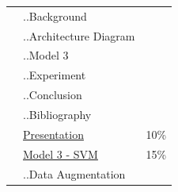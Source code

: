 \documentclass[paper=a4, fontsize=11pt]{scrartcl}
\numberwithin{equation}{section}		%
\numberwithin{table}{section}				%
\begin{document}
\begin{table}[h!]
\begin{center}
\begin{tabular}{l|l|c}
                     & ..Background&\\
                     & ..Architecture Diagram&\\
                     & ..Model 3&\\
                     & ..Experiment&\\
                     & ..Conclusion&\\
                     & ..Bibliography&\\
                     & \underline{Presentation}& 10\%\\
                     & \underline{Model 3 - SVM}& 15\%\\
                     & ..Data Augmentation&\\          
    \end{tabular}
  \end{center}
\end{table}

\clearpage
 




\end{document}
